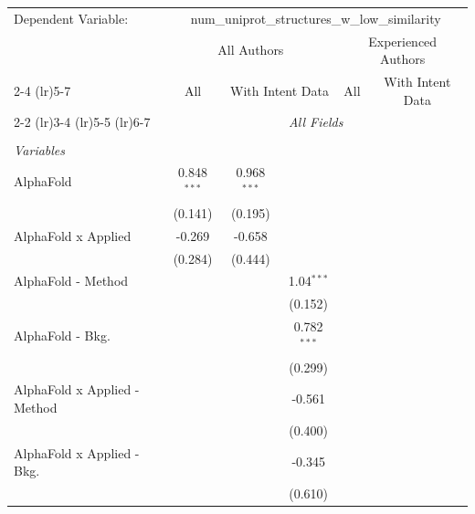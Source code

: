 \begingroup
\centering
\begin{tabular}{lcccccc}
   \tabularnewline \midrule \midrule
   Dependent Variable: & \multicolumn{6}{c}{num\_uniprot\_structures\_w\_low\_similarity}\\
 & \multicolumn{3}{c}{All Authors} & \multicolumn{3}{c}{Experienced Authors} \\
\cmidrule(lr){2-4} \cmidrule(lr){5-7}
 & \multicolumn{1}{c}{All} & \multicolumn{2}{c}{With Intent Data} & \multicolumn{1}{c}{All} & \multicolumn{2}{c}{With Intent Data} \\
\cmidrule(lr){2-2} \cmidrule(lr){3-4} \cmidrule(lr){5-5} \cmidrule(lr){6-7}
 & \multicolumn{6}{c}{\textit{All Fields}} \\ \\
   \emph{Variables}\\
   AlphaFold                      & 0.848$^{***}$ & 0.968$^{***}$ &               &        &        &   \\   
                                  & (0.141)       & (0.195)       &               &        &        &   \\   
   AlphaFold x Applied            & -0.269        & -0.658        &               &        &        &   \\   
                                  & (0.284)       & (0.444)       &               &        &        &   \\   
   AlphaFold - Method             &               &               & 1.04$^{***}$  &        &        &   \\   
                                  &               &               & (0.152)       &        &        &   \\   
   AlphaFold - Bkg.               &               &               & 0.782$^{***}$ &        &        &   \\   
                                  &               &               & (0.299)       &        &        &   \\   
   AlphaFold x Applied - Method   &               &               & -0.561        &        &        &   \\   
                                  &               &               & (0.400)       &        &        &   \\   
   AlphaFold x Applied - Bkg.     &               &               & -0.345        &        &        &   \\   
                                  &               &               & (0.610)       &        &        &   \\   

\end{tabular}
